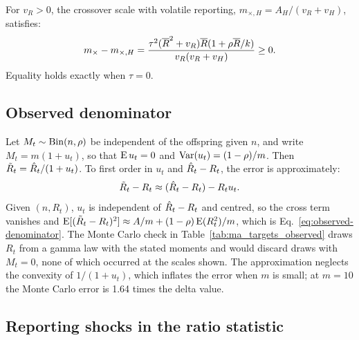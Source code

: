 For $v_R>0$, the crossover scale with volatile reporting, $m_{\times,H}=A_H/(v_R+v_H)$, satisfies:
\begin{equation}
 m_\times-m_{\times,H}
 =\frac{\tau^2(\overline{R}^2+v_R)\overline{R}(1+\rho\overline{R}/k)}{v_R(v_R+v_H)}\ge0.
 \label{eq:mx-gap}
\end{equation}
Equality holds exactly when $\tau=0$.

\subsection{Observed denominator}
\label{app:observed-denominator}

Let $M_t\sim\operatorname{Bin}(n,\rho)$ be independent of the offspring given $n$, and write $M_t=m(1+u_t)$, so that $\operatorname{E} u_t=0$ and $\operatorname{Var}(u_t)=(1-\rho)/m$. Then $\tilde R_t=\hat R_t/(1+u_t)$. To first order in $u_t$ and $\hat R_t-R_t$, the error is approximately:
\begin{equation}
 \tilde R_t-R_t\approx(\hat R_t-R_t)-R_tu_t .
\end{equation}
Given $(n,R_t)$, $u_t$ is independent of $\hat R_t-R_t$ and centred, so the cross term vanishes and
$\operatorname{E}[(\tilde R_t-R_t)^2]\approx A/m+(1-\rho)\operatorname{E}(R_t^2)/m$, which is Eq.~\eqref{eq:observed-denominator}. The Monte Carlo check in Table~\ref{tab:ma_targets_observed} draws $R_t$ from a gamma law with the stated moments and would discard draws with $M_t=0$, none of which occurred at the scales shown. The approximation neglects the convexity of $1/(1+u_t)$, which inflates the error when $m$ is small; at $m=10$ the Monte Carlo error is 1.64 times the delta value.

\subsection{Reporting shocks in the ratio statistic}
\label{app:ratio-shocks}

